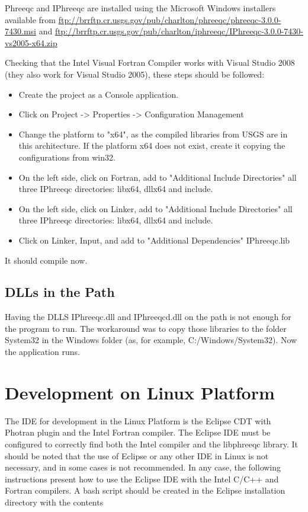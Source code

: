 \documentclass[12pt,a4paper,twoside]{report}
\begin{document}
Phreeqc and IPhreeqc are installed using the Microsoft Windows installers available from 
\url{ftp://brrftp.cr.usgs.gov/pub/charlton/phreeqc/phreeqc-3.0.0-7430.msi} and
\url{ftp://brrftp.cr.usgs.gov/pub/charlton/iphreeqc/IPhreeqc-3.0.0-7430-vs2005-x64.zip} 

Checking that the Intel Visual Fortran Compiler works with Visual Studio 2008 (they also work for Visual Studio 2005), these steps should be followed:

\begin{itemize}
 \item Create the project as a Console application.
 \item Click on Project -> Properties -> Configuration Management
 \item Change the platform to "x64", as the compiled libraries from USGS are in this architecture. If the platform x64 does not exist, create it copying the configurations from win32.
 \item On the left side, click on Fortran, add to "Additional Include Directories" all three IPhreeqc directories: libx64, dllx64 and include.
 \item On the left side, click on Linker, add to "Additional Include Directories" all three IPhreeqc directories: libx64, dllx64 and include.
 \item Click on Linker, Input, and add to "Additional Dependencies" IPhreeqc.lib
\end{itemize}
It should compile now.

\subsection{DLLs in the Path}

Having the DLLS IPhreeqc.dll and IPhreeqcd.dll on the path is not enough for the program to run. The workaround was to copy those libraries to the folder System32 in the Windows folder (as, for example, C:/Windows/System32). Now the application runs.


\section{Development on Linux Platform}
The IDE for development in the Linux Platform is the Eclipse CDT with Photran plugin and the Intel Fortran compiler. The Eclipse IDE must be configured to correctly find both the Intel compiler and the libphreeqc library. It should be noted that the use of Eclipse or any other IDE in Linux is not necessary, and in some cases is not recommended. In any case, the following instructions present how to use the Eclipse IDE with the Intel C/C++ and Fortran compilers. A bash script should be created in the Eclipse installation directory with the contents
\end{document}
